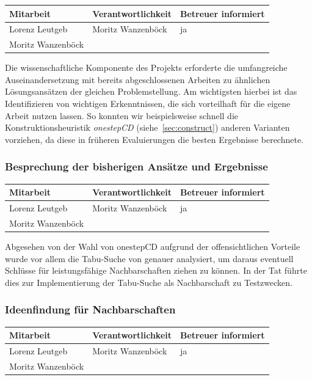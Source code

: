 \begin{center}
\begin{tabular}{lll}
	Mitarbeit & Verantwortlichkeit & Betreuer informiert \\
	\hline
	Lorenz Leutgeb & Moritz Wanzenböck & ja \\
	Moritz Wanzenböck & & \\
\end{tabular}
\end{center}

Die wissenschaftliche Komponente des Projekts erforderte die umfangreiche Auseinandersetzung mit bereits abgeschlossenen Arbeiten zu ähnlichen Lösungsansätzen der gleichen Pro\-blem\-stel\-lung. Am wichtigsten hierbei ist das Identifizieren von wichtigen Erkenntnissen, die sich vorteilhaft für die eigene Arbeit nutzen lassen. So konnten wir beispielsweise schnell die Konstruktionsheuristik \textit{onestepCD} (siehe~\ref{sec:construct}) anderen Varianten vorziehen, da diese in früheren Evaluierungen die besten Ergebnisse berechnete.

\subsubsection{ Besprechung der bisherigen Ansätze und Ergebnisse}

\begin{center}
\begin{tabular}{lll}
	Mitarbeit & Verantwortlichkeit & Betreuer informiert \\
	\hline
	Lorenz Leutgeb & Moritz Wanzenböck & ja \\
	Moritz Wanzenböck & & \\
\end{tabular}
\end{center}

Abgesehen von der Wahl von onestepCD aufgrund der offensichtlichen Vorteile wurde vor allem die Tabu-Suche von \citet*{Noronha2006} genauer analysiert, um daraus eventuell Schlüsse für leistungsfähige Nachbarschaften ziehen zu können. In der Tat führte dies zur Implementierung der Tabu-Suche als Nachbarschaft zu Testzwecken. %

\subsubsection{ Ideenfindung für Nachbarschaften}

\begin{center}
\begin{tabular}{lll}
	Mitarbeit & Verantwortlichkeit & Betreuer informiert \\
	\hline
	Lorenz Leutgeb & Moritz Wanzenböck & ja \\
	Moritz Wanzenböck & & \\
\end{tabular}
\end{center}

